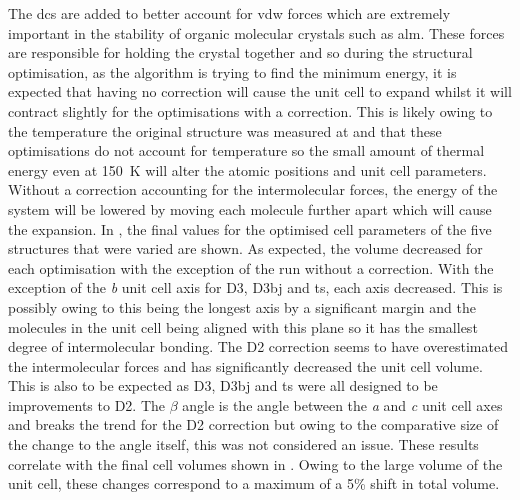 The \acrshort{dc}s are added to better account for \acrfull{vdw} forces which are extremely important in the stability of organic molecular crystals such as \acrshort{alm}. These forces are responsible for holding the crystal together and so during the structural optimisation, as the algorithm is trying to find the \DIFdelbegin {}\DIFdelend \DIFaddbegin {}\DIFaddend minimum energy, it is expected that having no correction will cause the unit cell to expand whilst it will contract slightly for the optimisations with a correction. This is likely owing to the temperature the original structure was measured at and that these optimisations do not account for temperature so the small amount of thermal energy even at \SI{150}{K} will alter the atomic positions and unit cell parameters. Without a correction accounting for the intermolecular forces, the energy of the system will be lowered by moving each molecule further apart which will cause the expansion. In , the final values for the optimised cell parameters of the five structures that were varied are shown. As expected, the volume decreased for each optimisation with the exception of the run without a correction. With the exception of the \textit{b} unit cell axis for D3, D3\acrshort{bj} and \acrshort{ts}, each axis decreased. This is possibly owing to this being the longest axis by a significant margin and the molecules in the unit cell being aligned with this plane so it has the smallest degree of intermolecular bonding. The D2 correction seems to have overestimated the intermolecular forces and has significantly decreased the unit cell volume. This is also to be expected as D3, D3\acrshort{bj} and \acrshort{ts} were all designed to be improvements to D2. The \(\beta\) angle is the angle between the \textit{a} and \textit{c} unit cell axes and breaks the trend for the D2 correction but owing to the comparative size of the change to the angle itself, this was not considered an issue. These results correlate with the final cell volumes shown in . Owing to the large volume of the unit cell, these changes correspond to a maximum of a 5\% shift in total volume.

